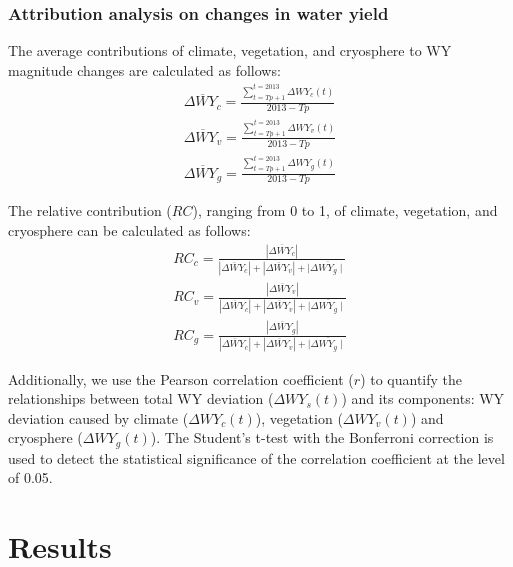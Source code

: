 \documentclass[hess, manuscript]{copernicus}
\begin{document}
\subsubsection{Attribution analysis on changes in water yield}
The average contributions of climate, vegetation, and cryosphere to WY magnitude changes are calculated as follows:
\begin{equation}
    \begin{split}
        \overline{\Delta WY_{c}}=\frac{\sum_{t=Tp+1}^{t=2013} \Delta WY_{c}(t)}{2013-Tp}\\
        \overline{\Delta WY_{v}}=\frac{\sum_{t=Tp+1}^{t=2013} \Delta WY_{v}(t)}{2013-Tp}\\
        \overline{\Delta WY_{g}}=\frac{\sum_{t=Tp+1}^{t=2013} \Delta WY_{g}(t)}{2013-Tp}
    \end{split}
\end{equation}

The relative contribution ($RC$), ranging from 0 to 1, of climate, vegetation, and cryosphere can be calculated as follows:
\begin{equation}
    \begin{split}
        RC_{c}=\frac{\left|\overline{\Delta WY_{c}}\right|}{\left|\overline{\Delta WY_{c}}\right|+\left|\overline{\Delta WY_{v}}\right|+\mid \overline{\Delta WY_{g} \mid}}\\
        RC_{v}=\frac{\left|\overline{\Delta WY_{v}}\right|}{\left|\overline{\Delta WY_{c}}\right|+\left|\overline{\Delta WY_{v}}\right|+\mid \overline{\Delta WY_{g} \mid}}\\
        RC_{g}=\frac{\left|\overline{\Delta WY_{g}}\right|}{\left|\overline{\Delta WY_{c}}\right|+\left|\overline{\Delta WY_{v}}\right|+\mid \overline{\Delta WY_{g} \mid}}
    \end{split}
\end{equation}

Additionally, we use the Pearson correlation coefficient ($r$) to quantify the relationships between total WY deviation ($\Delta WY_s(t)$) and its components: WY deviation caused by climate ($\Delta WY_c(t)$), vegetation ($\Delta WY_v(t)$) and cryosphere ($\Delta WY_g(t)$). The Student's t-test with the Bonferroni correction \citep{bonferroni1935calcolo} is used to detect the statistical significance of the correlation coefficient at the level of 0.05.

\section{Results}
\end{document}
